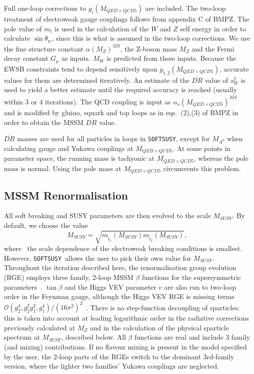 \documentclass{article}
\def\SOFTSUSY{{\tt SOFTSUSY}}
\begin{document}
Full one-loop corrections to $g_i(M_{QED \times QCD5})$ are
included. 
The two-loop treatment of electroweak gauge couplings follows
from appendix C of BMPZ. The pole value
of $m_t$ is used in the calculation of the $W$ and $Z$ self energy in order to
calculate $\sin \theta_w$, since this is what is assumed in the two-loop
corrections. 
We use the fine structure constant $\alpha(M_{Z})^{\overline{MS}}$, the Z-boson
mass 
$M_Z$ and the Fermi decay constant $G_\mu$ as inputs. $M_W$ is predicted from
these inputs.
Because the EWSB constraints tend to 
depend sensitively upon $g_{1,2}(M_{QED \times QCD5})$, accurate values for them are
determined iteratively. 
An estimate of the $\overline{DR}$ value of $s_W^2$ is used to yield a
better estimate until the required accuracy is reached (usually within 3 or
4 iterations).
The QCD coupling is input as $\alpha_s(M_{QED \times QCD5})^{\overline{MS}}$ and
is modified by gluino, squark and top loops as in
eqs.~(2),(3) of BMPZ in order to obtain the MSSM $\overline{DR}$ value. 

$\overline{DR}$ masses are used for all particles in loops in \SOFTSUSY, except
for $M_{A^0}$ when calculating gauge and Yukawa couplings at $M_{QED \times QCD5}$. At some
points in parameter space, the running mass is tachyonic at $M_{QED \times QCD5}$, whereas the
pole mass is normal. Using the pole mass at $M_{QED \times QCD5}$ circumvents
this problem. 

\subsection{MSSM Renormalisation}

All soft breaking and SUSY parameters are then evolved to the scale
$M_{SUSY}$. By default, we choose the value
\begin{equation}
M_{SUSY} =\sqrt{m_{{\tilde t}_1}(M_{SUSY}) m_{{\tilde t}_2}(M_{SUSY})}, \label{msusy}
\end{equation}
where~\cite{Casas:1998vh} the scale dependence of the electroweak
breaking conditions is smallest. However, \SOFTSUSY~allows the user to pick
their own value for $M_{SUSY}$.
Throughout the iteration described here, the renormalisation group evolution
(RGE) employs three family,
2-loop MSSM $\beta$ functions for the supersymmetric
parameters~\cite{Barger:1994gh}.
$\tan \beta$ and the Higgs VEV
parameter $v$ are also run to two-loop order in the Feynman gauge, although
the Higgs VEV RGE is missing terms ${\mathcal O}(g_2^4, g_2^2 g_1^2,
g_1^4) / (16 \pi^2)^2$~\cite{Martin:2001vx,Yamada:2001ck}. 
There is no
step-function decoupling of sparticles: this is taken into account at leading
logarithmic order in the radiative corrections previously calculated at $M_Z$
and in the calculation of the physical sparticle spectrum at $M_{SUSY}$, described
below. All $\beta$ functions are real and include 3 family (and mixing)
contributions. If no flavour mixing is present in the model specified by the
user, the 2-loop parts of the RGEs switch to the dominant 3rd-family version,
where the lighter two families' Yukawa couplings are neglected.
\end{document}
